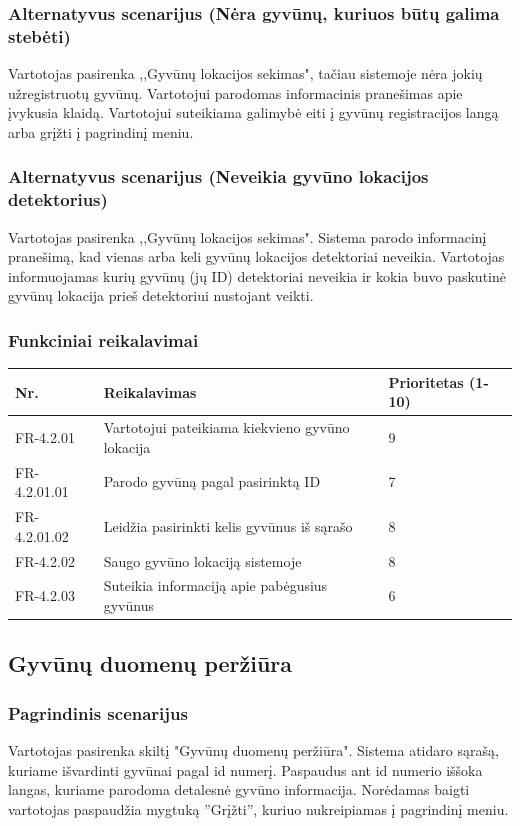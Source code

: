 \documentclass[oneside]{VUMIFPSkursinis}
\begin{document}
	\subsubsection{Alternatyvus scenarijus (Nėra gyvūnų, kuriuos būtų galima stebėti)}
	Vartotojas pasirenka ,,Gyvūnų lokacijos sekimas", tačiau sistemoje nėra jokių užregistruotų gyvūnų. Vartotojui parodomas informacinis pranešimas apie įvykusia klaidą. Vartotojui suteikiama galimybė eiti į gyvūnų registracijos langą arba grįžti į pagrindinį meniu.
	\subsubsection{Alternatyvus scenarijus (Neveikia gyvūno lokacijos detektorius)}
	Vartotojas pasirenka ,,Gyvūnų lokacijos sekimas". Sistema parodo informacinį pranešimą, kad vienas arba keli gyvūnų lokacijos detektoriai neveikia. Vartotojas informuojamas kurių gyvūnų (jų ID) detektoriai neveikia ir kokia buvo paskutinė gyvūnų lokacija prieš detektoriui nustojant veikti.
	\subsubsection{Funkciniai reikalavimai}
\begin{table}[htbp]
	\begin{tabularx}{1\textwidth}{ |P{2.5cm}|X|P{3cm }| }  \hline
	Nr. & Reikalavimas &  Prioritetas (1-10)  \\   \hline 
	FR-4.2.01 & Vartotojui pateikiama kiekvieno gyvūno lokacija & 9 \\   \hline  
	FR-4.2.01.01 & Parodo gyvūną pagal pasirinktą ID & 7 \\   \hline 
	FR-4.2.01.02 & Leidžia pasirinkti kelis gyvūnus iš sąrašo & 8 \\   \hline 
	FR-4.2.02 & Saugo gyvūno lokaciją sistemoje & 8 \\   \hline 
	FR-4.2.03 & Suteikia informaciją apie pabėgusius gyvūnus & 6 \\   \hline 
\end{tabularx}
\end{table}
	\pagebreak
\subsection{Gyvūnų duomenų peržiūra}
\subsubsection{Pagrindinis scenarijus}
	Vartotojas pasirenka skiltį "Gyvūnų duomenų peržiūra". Sistema atidaro sąrašą, kuriame išvardinti gyvūnai pagal id numerį. Paspaudus ant id numerio iššoka langas, kuriame parodoma detalesnė gyvūno informacija. Norėdamas baigti vartotojas paspaudžia mygtuką ''Grįžti'', kuriuo nukreipiamas į pagrindinį meniu.
\end{document}
